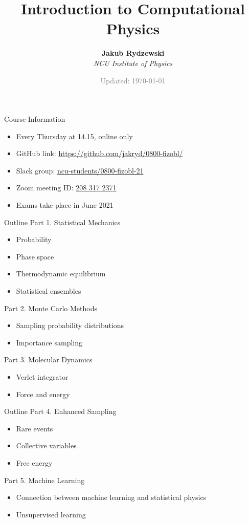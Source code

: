 \documentclass[10pt]{beamer}
\title{Introduction to Computational Physics}
\author{\textbf{Jakub Rydzewski}\\[5pt]
  \footnotesize{\it NCU Institute of Physics}}
\date{\footnotesize\textcolor{gray}{Updated: \today}}
\begin{document}
{\frame{\titlepage}}

\begin{frame}{Course Information}
\begin{itemize}
\setlength\itemsep{1em}
  \item Every Thursday at 14.15, online only
  \item GitHub link: \url{https://github.com/jakryd/0800-fizobl/}
  \item Slack group: \href{https://join.slack.com/t/ncu-students/shared_invite/zt-n1meknwx-_poiBXXMrYVbn9iHDj5rPw}{ncu-students/﻿0800-fizobl-21}
  \item Zoom meeting ID: \href{https://zoom.us/j/2803172371?pwd=NVQ3c1FUZEZhNlZKaVZKSndHWjRaZz09}{208 317 2371}
  \item Exams take place in June 2021
\end{itemize}
\end{frame}

\begin{frame}{Outline}
\textcolor{subtitle}{Part 1. Statistical Mechanics}
\begin{itemize}
  \item Probability
  \item Phase space
  \item Thermodynamic equilibrium
  \item Statistical ensembles
\end{itemize}
\vspace{0.5cm}

\textcolor{subtitle}{Part 2. Monte Carlo Methods}
\begin{itemize}
  \item Sampling probability distributions
  \item Importance sampling
\end{itemize}
\vspace{0.5cm}

\textcolor{subtitle}{Part 3. Molecular Dynamics}
\begin{itemize}
  \item Verlet integrator
  \item Force and energy
\end{itemize}
\end{frame}

\begin{frame}{Outline}
\textcolor{subtitle}{Part 4. Enhanced Sampling}
\begin{itemize}
  \item Rare events
  \item Collective variables
  \item Free energy
\end{itemize}
\vspace{0.5cm}

\textcolor{subtitle}{Part 5. Machine Learning}
\begin{itemize}
  \item Connection between machine learning and statistical physics
  \item Unsupervised learning
\end{itemize}
\end{frame}
\end{document}
